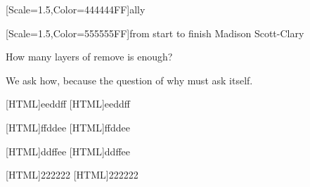 \documentclass[11pt,onesided]{memoir}
\begin{document}
  \frontmatter

  
  

  \pagestyle{plain}

  \doublespacing

  \null
  \vfill
  \begin{flushright}
    {[Scale=1.5,Color=444444FF]\Huge ally}

    \vfill
    
    {[Scale=1.5,Color=555555FF]\normalsize from start to finish}
    \vfill
    {\Huge Madison Scott-Clary}
  \end{flushright}
  \thispagestyle{empty}

  \newpage

  

  \newpage
  \null
  \thispagestyle{empty}
  \cleardoublepage

  \onehalfspacing

  \null
  \vfill
  \begin{center}
    How many layers of remove is enough?

    \vfill

    We ask how, because the question of why must ask itself.
  \end{center}
  \vfill

  \mainmatter

  \pagestyle{ourbook}
  \setlength\columnsep{20pt}
  [HTML]{eeddff}
  [HTML]{eeddff}
  
  [HTML]{ffddee}
  [HTML]{ffddee}
  
  [HTML]{ddffee}
  [HTML]{ddffee}
  
  [HTML]{222222}
  [HTML]{222222}
  


  \backmatter
  \pagestyle{empty}
\end{document}
